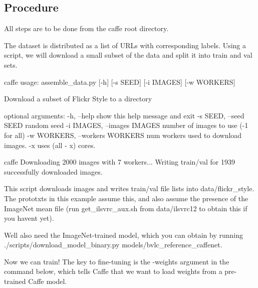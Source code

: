 \subsection*{Procedure}

All steps are to be done from the caffe root directory.

The dataset is distributed as a list of U\+R\+Ls with corresponding labels. Using a script, we will download a small subset of the data and split it into train and val sets. \begin{DoxyVerb}caffe %
usage: assemble_data.py [-h] [-s SEED] [-i IMAGES] [-w WORKERS]

Download a subset of Flickr Style to a directory

optional arguments:
  -h, --help            show this help message and exit
  -s SEED, --seed SEED  random seed
  -i IMAGES, --images IMAGES
                        number of images to use (-1 for all)
  -w WORKERS, --workers WORKERS
                        num workers used to download images. -x uses (all - x)
                        cores.

caffe %
Downloading 2000 images with 7 workers...
Writing train/val for 1939 successfully downloaded images.
\end{DoxyVerb}


This script downloads images and writes train/val file lists into {\ttfamily data/flickr\+\_\+style}. The prototxts in this example assume this, and also assume the presence of the Image\+Net mean file (run {\ttfamily get\+\_\+ilsvrc\+\_\+aux.\+sh} from {\ttfamily data/ilsvrc12} to obtain this if you haven\textquotesingle{}t yet).

We\textquotesingle{}ll also need the Image\+Net-\/trained model, which you can obtain by running {\ttfamily ./scripts/download\+\_\+model\+\_\+binary.py models/bvlc\+\_\+reference\+\_\+caffenet}.

Now we can train! The key to fine-\/tuning is the {\ttfamily -\/weights} argument in the command below, which tells Caffe that we want to load weights from a pre-\/trained Caffe model.

